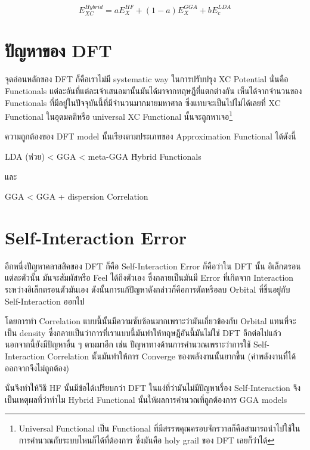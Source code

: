 \begin{equation}
    E^{Hybrid}_{XC} = a E^{HF}_{X} + (1 - a) E^{GGA}_{X} + b E^{LDA}_{c}
\end{equation}

\section{ปัญหาของ DFT}

จุดอ่อนหลักของ DFT ก็คือเราไม่มี systematic way ในการปรับปรุง XC Potential นั่นคือ Functionals 
แต่ละอันที่แต่ละเจ้าเสนอมานั้นมันได้มาจากทฤษฎีที่แตกต่างกัน เห็นได้จากจำนวนของ Functionals 
ที่มีอยู่ในปัจจุบันนี้ที่มีจำนวนมากมายมหาศาล ซึ่งแทบจะเป็นไปไม่ได้เลยที่ XC Functional ในอุดมคติหรือ 
universal XC Functional นั้นจะถูกหาเจอ\footnote{Universal Functional เป็น Functional 
ที่มีสรรพคุณครอบจักรวาลก็คือสามารถนำไปใช้ในการคำนวณกับระบบไหนก็ได้ที่ต้องการ ซึ่งมันคือ holy grail 
ของ DFT เลยก็ว่าได้}

ความถูกต้องของ DFT model นั้นเรียงตามประเภทของ Approximation Functional ได้ดังนี้ 

LDA (ห่วย) < GGA < meta-GGA \~ Hybrid Functionals 

\noindent และ 

GGA < GGA + dispersion Correlation 

\section{Self-Interaction Error}

อีกหนึ่งปัญหาคลาสสิคของ DFT ก็คือ Self-Interaction Error ก็คือว่าใน DFT นั้น อิเล็กตรอนแต่ละตัวนั้น%
มันจะสัมผัสหรือ Feel ได้ถึงตัวเอง ซึ่งกลายเป็นมันมี Error ที่เกิดจาก Interaction ระหว่างอิเล็กตรอนตัวมันเอง 
ดังนั้นการแก้ปัญหาดังกล่าวก็คือการตัดหรือลบ Orbital ที่ขึ้นอยู่กับ Self-Interaction ออกไป 

โดยการทำ Correlation แบบนี้นั้นมีความซับซ้อนมากเพราะว่ามันเกี่ยวข้องกับ Orbital แทนที่จะเป็น density 
ซึ่งกลายเป็นว่าการที่เราแบบนี้มันทำให้ทฤษฎีอันนี้มันไม่ใช่ DFT อีกต่อไปแล้ว นอกจากนี้ยังมีปัญหาอื่น ๆ ตามมาอีก เช่น 
ปัญหาทางด้านการคำนวณเพราะว่าการใช้ Self-Interaction Correlation นั้นมันทำให้การ Converge 
ของพลังงานนั้นยากขึ้น (ค่าพลังงานที่ได้ออกจากจึงไม่ถูกต้อง)

นั่นจึงทำให้วิธี HF นั้นมีข้อได้เปรียบกว่า DFT ในแง่ที่ว่ามันไม่มีปัญหาเรื่อง Self-Interaction จึงเป็นเหตุผลที่ว่าทำไม 
Hybrid Functional นั้นให้ผลการคำนวณที่ถูกต้องการ GGA models 
